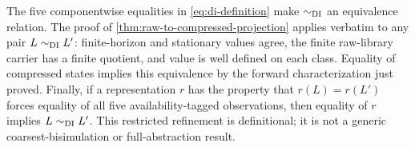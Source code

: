 The five componentwise equalities in \eqref{eq:di-definition} make
\(\sim_{\mathrm{DI}}\) an equivalence relation.
\label{prop:di-equivalence-relation}
The proof of \cref{thm:raw-to-compressed-projection} applies verbatim to any
pair \(L\sim_{\mathrm{DI}}L'\): finite-horizon and stationary values agree, the finite
raw-library carrier has a finite quotient, and value is well defined on each
class.  Equality of compressed states implies this equivalence by the forward
characterization just proved.
\label{thm:di-quotient-sufficiency}
Finally, if a representation \(r\) has the property that \(r(L)=r(L')\)
forces equality of all five availability-tagged observations, then equality
of \(r\) implies \(L\sim_{\mathrm{DI}}L'\).
\label{prop:di-refinement-minimality}
This restricted refinement is definitional; it is not a generic
coarsest-bisimulation or full-abstraction result.
